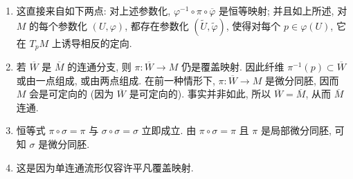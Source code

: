 \begin{description}[font=\normalfont,leftmargin=2em,labelwidth=1.5em]
\begin{enumerate}[label=(\alph*),ref=\alph*,leftmargin=*]
给定 $M$ 的两个参数化 $(U,\varphi)$ 与 $(V,\psi)$, 映射 $\overline{\psi}^{-1}\circ\overline{\varphi}$ 定义在 $\varphi(U)\cap\psi(V)$ 中那些由 $\varphi$ 与 $\psi$ 诱导的定向一致的连通分支在 $\varphi^{-1}$ 下的像上. 因此 $\overline{\psi}^{-1}\circ\overline{\varphi}$ 不仅可微 (在有定义的点处, $\overline{\psi}^{-1}\circ\overline{\varphi}=\psi^{-1}\circ\varphi$), 而且保持定向. 可知
\[
  \{(U,\overline{\varphi})\mid (U,\varphi)\text{ 是 }M\text{ 的参数化}\}
\]
是 $\overline M$ 的一个图册, 其过渡映射保持定向. 因此, $\overline M$ 是一个\textbf{可定向的} $n$ 维流形 [参见 Exercise~\ref{ex:orientability}(\ref{ex:characterize-orientable-manifold-by-atlas})].
\item 这直接来自如下两点: 对上述参数化, $\varphi^{-1}\circ\pi\circ\overline\varphi$ 是恒等映射; 并且如上所述, 对 $M$ 的每个参数化 $(U,\varphi)$, 都存在参数化 $(\widetilde U,\widetilde\varphi)$, 使得对每个 $p\in\varphi(U)$, 它在 $T_pM$ 上诱导相反的定向.
\item 若 $\overline W$ 是 $\overline M$ 的连通分支, 则 $\pi:\overline W\to M$ 仍是覆盖映射. 因此纤维 $\pi^{-1}(p)\subset\overline W$ 或由一点组成, 或由两点组成. 在前一种情形下, $\pi:\overline W\to M$ 是微分同胚, 因而 $M$ 会是可定向的 (因为 $\overline W$ 是可定向的). 事实并非如此, 所以 $\overline W=\overline M$, 从而 $\overline M$ 连通.
\item 恒等式 $\pi\circ\sigma=\pi$ 与 $\sigma\circ\sigma=\sigma$ 立即成立. 由 $\pi\circ\sigma=\pi$ 且 $\pi$ 是局部微分同胚, 可知 $\sigma$ 是微分同胚.
\item 这是因为单连通流形仅容许平凡覆盖映射.
\end{enumerate}
\end{description}
